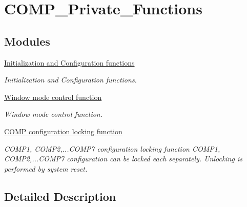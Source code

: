 \hypertarget{group___c_o_m_p___private___functions}{\section{C\-O\-M\-P\-\_\-\-Private\-\_\-\-Functions}
\label{group___c_o_m_p___private___functions}
}
\subsection*{Modules}
\begin{DoxyCompactItemize}
\item 
\hyperlink{group___c_o_m_p___group1}{Initialization and Configuration functions}
\begin{DoxyCompactList}\small\item\em Initialization and Configuration functions. \end{DoxyCompactList}\item 
\hyperlink{group___c_o_m_p___group2}{Window mode control function}
\begin{DoxyCompactList}\small\item\em Window mode control function. \end{DoxyCompactList}\item 
\hyperlink{group___c_o_m_p___group3}{C\-O\-M\-P configuration locking function}
\begin{DoxyCompactList}\small\item\em C\-O\-M\-P1, C\-O\-M\-P2,...C\-O\-M\-P7 configuration locking function C\-O\-M\-P1, C\-O\-M\-P2,...C\-O\-M\-P7 configuration can be locked each separately. Unlocking is performed by system reset. \end{DoxyCompactList}\end{DoxyCompactItemize}


\subsection{Detailed Description}
